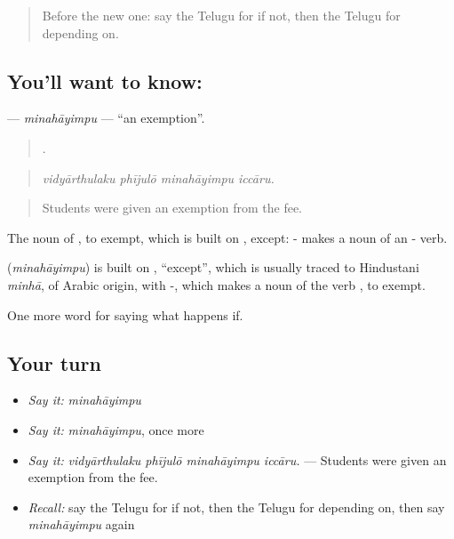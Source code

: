\label{lesson:TE-C419-minahayimpu}



\begin{quote}
Before the new one: say the Telugu for if not, then the Telugu for depending on.
\end{quote}

\subsection*{You'll want to know: }
\textbf{} — \emph{minahāyimpu} — \textquotedblleft{}an exemption\textquotedblright{}.

\begin{quote}
   .
\end{quote}

\begin{quote}
\emph{vidyārthulaku phījulō minahāyimpu iccāru.}
\end{quote}

\begin{quote}
Students were given an exemption from the fee.
\end{quote}

The noun of , to exempt, which is built on , except: - makes a noun of an - verb.

\begin{cousinweb}
\textbf{} (\emph{minahāyimpu}) is built on , \textquotedblleft{}except\textquotedblright{}, which is usually traced to Hindustani \emph{minhā}, of Arabic origin, with -, which makes a noun of the verb , to exempt.
\end{cousinweb}

\begin{grammarlens}[title={What you've built}]
One more word for saying what happens if.
\end{grammarlens}

\subsection*{Your turn}
\begin{itemize}
\raggedright
  \item \emph{Say it:} \emph{minahāyimpu}
  \item \emph{Say it:} \emph{minahāyimpu}, once more
  \item \emph{Say it:} \emph{vidyārthulaku phījulō minahāyimpu iccāru.} — Students were given an exemption from the fee.
  \item \emph{Recall:} say the Telugu for if not, then the Telugu for depending on, then say \emph{minahāyimpu} again
\end{itemize}

